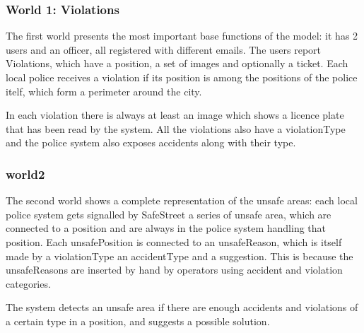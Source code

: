 \subsubsection{World 1: Violations}
The first world presents the most important base functions of the model: it has 2 users and an
officer, all registered with different emails. The users report Violations, which have a position, a set of images
and optionally a ticket. Each local police receives a violation if its position is among the positions of the police itelf,
which form a perimeter around the city.

In each violation there is always at least an image which shows a licence plate that has been read
by the system. All the violations also have a violationType and the police system also exposes accidents along with their type.

\begin{figure}
    \noindent{}
\end{figure}

\subsubsection{world2}
The second world shows a complete representation of the unsafe areas: each local police system gets signalled by SafeStreet
a series of unsafe area, which are connected to a position and are always in the police system handling that position.
Each unsafePosition is connected to an unsafeReason, which is itself made by a violationType an accidentType and a suggestion. This is
because the unsafeReasons are inserted by hand by operators using accident and violation categories.

The system detects an unsafe area if there are enough accidents and violations of a certain type in a position, and
suggests a possible solution.